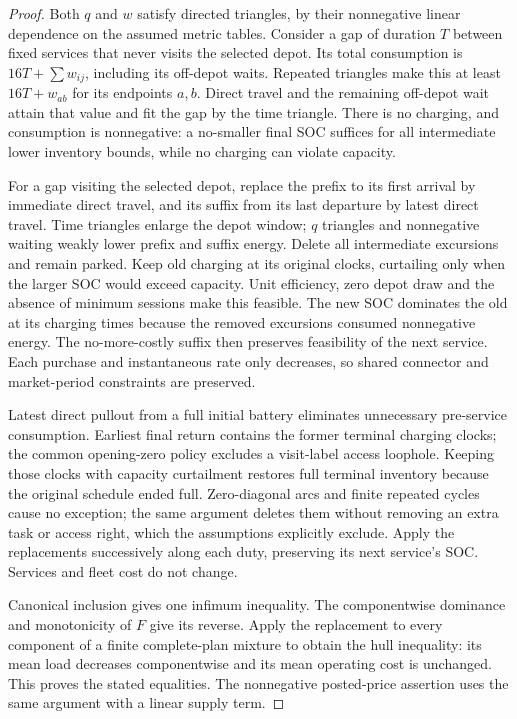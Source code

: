 \begin{proof}
Both $q$ and $w$ satisfy directed triangles, by their nonnegative linear
dependence on the assumed metric tables. Consider a gap of duration $T$
between fixed services that never visits the selected depot. Its total
consumption is $16T+\sum w_{ij}$, including its off-depot waits. Repeated
triangles make this at least $16T+w_{ab}$ for its endpoints $a,b$.
Direct travel and the remaining off-depot wait attain that value and fit
the gap by the time triangle. There is no charging, and consumption is
nonnegative: a no-smaller final SOC suffices for all intermediate lower
inventory bounds, while no charging can violate capacity.

For a gap visiting the selected depot, replace the prefix to its first
arrival by immediate direct travel, and its suffix from its last departure
by latest direct travel. Time triangles enlarge the depot window; $q$
triangles and nonnegative waiting weakly lower prefix and suffix energy.
Delete all intermediate excursions and remain parked. Keep old charging
at its original clocks, curtailing only when the larger SOC would exceed
capacity. Unit efficiency, zero depot draw and the absence of minimum
sessions make this feasible. The new SOC dominates the old at its charging
times because the removed excursions consumed nonnegative energy. The
no-more-costly suffix then preserves feasibility of the next service.
Each purchase and instantaneous rate only decreases, so shared connector
and market-period constraints are preserved.

Latest direct pullout from a full initial battery eliminates unnecessary
pre-service consumption. Earliest final return contains the former
terminal charging clocks; the common opening-zero policy excludes a
visit-label access loophole. Keeping those clocks with capacity curtailment
restores full terminal inventory because the original schedule ended
full. Zero-diagonal arcs and finite repeated cycles cause no exception;
the same argument deletes them without removing an extra task or access
right, which the assumptions explicitly exclude. Apply the replacements
successively along each duty, preserving its next service's SOC. Services
and fleet cost do not change.

Canonical inclusion gives one infimum inequality. The componentwise
dominance and monotonicity of $F$ give its reverse. Apply the replacement
to every component of a finite complete-plan mixture to obtain the hull
inequality: its mean load decreases componentwise and its mean operating
cost is unchanged. This proves the stated equalities. The nonnegative
posted-price assertion uses the same argument with a linear supply term.
\end{proof}

